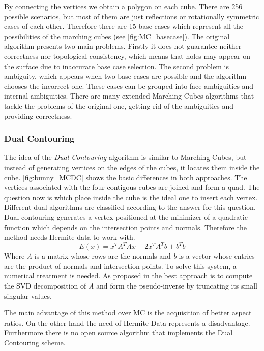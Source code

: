By connecting the vertices we obtain a polygon on each cube. There are 256 possible scenarios,
but most of them are just reflections or rotationally symmetric cases of each other. Therefore
there are 15 base cases which represent all the possibilities of the marching cubes (see \autoref{fig:MC_basecase}). 
The original algorithm presents two main problems. Firstly it does not guarantee neither
correctness nor topological consistency, which means that holes may appear on the surface due
to inaccurate base case selection. The second problem is ambiguity, which appears when two
base cases are possible and the algorithm chooses the incorrect one. These cases can be grouped
into face ambiguities and internal ambiguities. There are many extended Marching Cubes
algorithms that tackle the problems of the original one, getting rid of the ambiguities and
providing correctness.

\subsubsection{Dual Contouring}
The idea of the \emph{Dual Contouring} algorithm is similar to Marching Cubes, but instead of generating vertices on the
edges of the cubes, it locates them inside the cube. \autoref{fig:bunny_MCDC} shows the basic differences in both approaches.
The vertices associated with the four contigous cubes are joined and form a quad. The question now is
which place inside the cube is the ideal one to insert each vertex. Different dual algorithms are classified 
according to the answer for this question. Dual contouring generates a vertex positioned at the minimizer of a
quadratic function which depends on the intersection points and normals. Therefore the method needs Hermite 
data to work with.
\begin{equation*}
E(x)= x^TA^TAx-2x^TA^Tb+b^Tb
\end{equation*}
Where \textit{A} is a matrix whose rows are the normals and \textit{b} is a vector whose entries are the product of normals and intersection points. To solve this system, a numerical treatment is needed. As proposed in \cite{Hermite2002} the best approach is to compute the
SVD decomposition of \textit{A} and form the pseudo-inverse by truncating its small singular values. 


The main advantage of this method over MC is the acquisition of better aspect ratios. On the other hand the need of Hermite Data
represents a disadvantage. Furthermore there is no open source algorithm that implements the Dual Contouring scheme.

